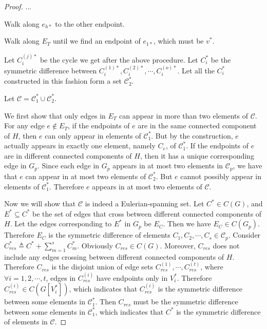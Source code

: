 \documentclass[10pt,fleqn]{article}
\newcommand{\mc}[1]{\mathcal{#1}}
\begin{document}
\begin{proof}
		... \par
		Walk along $e_{h*}$ to the other endpoint.\par 
		Walk along $E_T$ until we find an endpoint of $e_{1*}$, which must be $v^*$. \par
		Let $C_i^{(j)*}$ be the cycle we get after the above procedure. Let $C_i^*$ be the symmetric difference between $C_i^{(1)*},C_i^{(2)*},\cdots,C_i^{(o)*}$. Let all the $C_i^*$ constructed in this fashion form a set $\mc{C}_2^*$. \par
		Let $\mc{C}=\mc{C}_1^*\cup \mc{C}_2^*$. \par
		We first show that only edges in $E_T$ can appear in more than two elements of $\mc{C}$. For any edge $e\notin E_T$, if the endpoints of $e$ are in the same connected component of $H$, then $e$ can only appear in elements of $\mc{C}_1^*$. But by the construction, $e$ actually appears in exactly one element, namely $C_e$, of $\mc{C}_1^*$. If the endpoints of $e$ are in different connected components of $H$, then it has a unique corresponding edge in $G_p$. Since each edge in $G_p$ appears in at most two elements in $\mc{C}_p$, we have that $e$ can appear in at most two elements of $\mc{C}_2^*$. But $e$ cannot possibly appear in elements of $\mc{C}_1^*$. Therefore $e$ appears in at most two elements of $\mc{C}$. \par
		Now we will show that $\mc{C}$ is indeed a Eulerian-spanning set. Let $C^*\in C(G)$, and $E^*\subseteq C^*$ be the set of edges that cross between different connected components of $H$. Let the edges corresponding to $E^*$ in $G_p$ be $E_C$. Then we have $E_C\in C(G_p)$. Therefore $E_C$ is the symmetric difference of elements $C_1,C_2,\cdots,C_s\in\mc{C}_p$. Consider $C_{res}^*\triangleq C^*+\sum_{m=1}^sC_m^*$. Obviously $C_{res}\in C(G)$. Moreover, $C_{res}$ does not include any edges crossing between different connected components of $H$. Therefore $C_{res}$ is the disjoint union of edge sets $C_{res}^{(1)},\cdots,C_{res}^{(t)}$, where $\forall i=1,2,\cdots,t$, edges in $C_{res}^{(i)}$ have endpoints only in $V_i^{*}$. Therefore $C_{res}^{(i)}\in C(G[V_i^{*}])$, which indicates that $C_{res}^{(i)}$ is the symmetric difference between some elements in $\mc{C}_1^*$. Then $C_{res}$ must be the symmetric difference between some elements in $\mc{C}_1^*$, which indicates that $C^*$ is the symmetric difference of elements in $\mc{C}$. \par

\end{proof}
\end{document}
